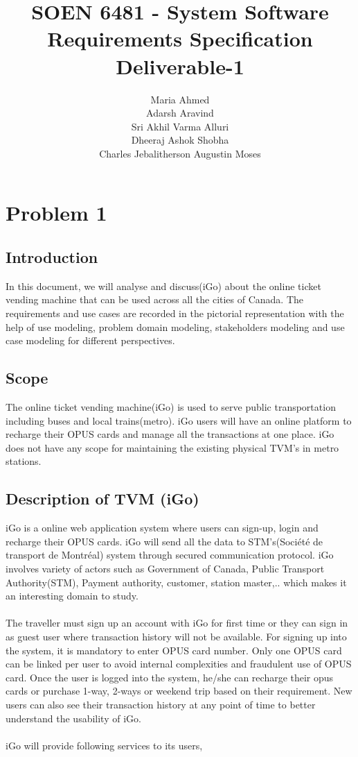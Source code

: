 \documentclass[a4paper, 11pt]{report}
\date{}
\title{SOEN 6481 - System Software Requirements Specification
\newline Deliverable-1}
\author{
\normalsize  {Maria Ahmed}\\
\normalsize  {Adarsh Aravind}\\
\normalsize  {Sri Akhil Varma Alluri}\\
\normalsize  {Dheeraj Ashok Shobha}\\
\normalsize  {Charles Jebalitherson Augustin Moses}}
\begin{document}
\maketitle
 
\tableofcontents
\chapter{Problem 1}
\section{Introduction}
In this document, we will analyse and discuss(iGo) about the online ticket vending machine that can be used across all the cities of Canada. The requirements and use cases are recorded in the pictorial representation with the help of use modeling, problem domain modeling, stakeholders modeling and use case modeling for different perspectives.
\section{Scope}
The online ticket vending machine(iGo) is used to serve public transportation including buses and local trains(metro). iGo users will have an online platform to recharge their OPUS cards and manage all the transactions at one place. iGo does not have any scope for maintaining the existing physical TVM's in metro stations.
\section{Description of TVM (iGo)}
iGo is a online web application system where users can sign-up, login and recharge their OPUS cards. iGo will send all the data to STM's(Société de transport de Montréal) system through secured communication protocol. iGo involves variety of actors such as Government of Canada, Public Transport Authority(STM), Payment authority, customer, station master,.. which makes it an interesting domain to study. \\\\
The traveller must sign up an account with iGo for first time or they can sign in as guest user where transaction history will not be available. For signing up into the system, it is mandatory to enter OPUS card number. Only one OPUS card can be linked per user to avoid internal complexities and fraudulent use of OPUS card. Once the user is logged into the system, he/she can recharge their opus cards or purchase 1-way, 2-ways or weekend trip based on their requirement. New users can also see their transaction history at any point of time to better understand the usability of iGo.\\\\
iGo will provide following services to its users,
\end{document}
